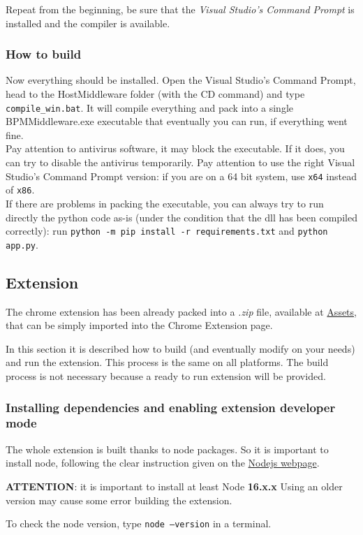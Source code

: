 Repeat from the beginning, be sure that the \textit{Visual Studio's Command Prompt} is installed and the compiler is available.

\subsubsection{How to build}
Now everything should be installed. Open the Visual Studio's Command Prompt, head to the HostMiddleware folder (with the CD command) and type \texttt{compile\_win.bat}. It will compile everything and pack into a single BPMMiddleware.exe executable that eventually you can run, if everything went fine.\\

Pay attention to antivirus software, it may block the executable. If it does, you can try to disable the antivirus temporarily. Pay attention to use the right Visual Studio's Command Prompt version: if you are on a 64 bit system, use \texttt{x64} instead of \texttt{x86}.\\

If there are problems in packing the executable, you can always try to run directly the python code as-is (under the condition that the dll has been compiled correctly): run \texttt{python -m pip install -r requirements.txt} and \texttt{python app.py}.

\subsection{Extension}
The chrome extension has been already packed into a \textit{.zip} file, available at \href{https://github.com/SEcube-Project/Browser-Password-Manager/releases}{Assets}, that can be simply imported into the Chrome Extension page.

In this section it is described how to build (and eventually modify on your needs) and run the extension. This process is the same on all platforms.
The build process is not necessary because a ready to run extension will be provided.

\subsubsection{Installing dependencies and enabling extension developer mode}
The whole extension is built thanks to node packages. So it is important to install node, following the clear instruction given on the \href{https://nodejs.org/}{Nodejs webpage}.

\begin{warning}
	\textbf{ATTENTION}: it is important to install at least Node \textbf{16.x.x} Using an older version may cause some error building the extension.
\end{warning}
To check the node version, type \texttt{node --version} in a terminal. 

